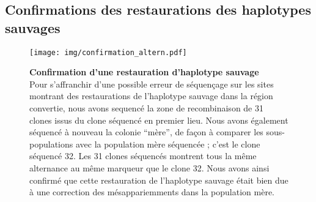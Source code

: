 
\subsection{Confirmations des restaurations des haplotypes sauvages}
\label{subsec:confirm-haplotype}

\begin{figure}[ht]
  \centering
  \texttt{[image: img/confirmation\_altern.pdf]}
  \caption[Confirmation des restaurations]{\label{fig:confirm-haplotype}
    \textbf{Confirmation d'une restauration d'haplotype sauvage} \\
    \rmfamily Pour s'affranchir d'une possible erreur de séquençage sur les
    sites montrant des restaurations de l'haplotype sauvage dans la région
    convertie, nous avons sequencé la zone de recombinaison de 31 clones issus
    du clone séquencé en premier lieu. Nous avons également séquencé à nouveau
    la colonie ``mère'', de façon à comparer les sous-populations avec la
    population mère séquencée ; c'est le clone séquencé \num{32}.
    Les 31 clones séquencés montrent tous la même alternance au même marqueur
    que le clone 32. Nous avons ainsi confirmé que cette restauration de
    l'haplotype sauvage était bien due à une correction des mésappariemments
    dans la population mère. }
\end{figure}


